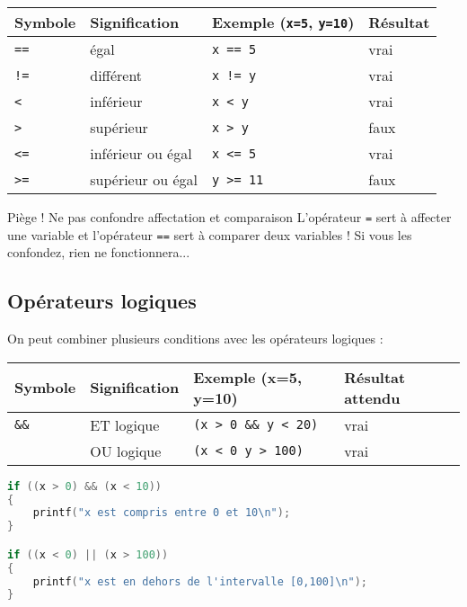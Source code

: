 \begin{center}
	\begin{tabular}{|l|l|l|l|}
		\hline
		Symbole     & Signification     & Exemple (\texttt{x=5}, \texttt{y=10}) & Résultat \\
		\hline
		\texttt{==} & égal              & \texttt{x == 5}                       & vrai     \\
		\texttt{!=} & différent         & \texttt{x != y}                       & vrai     \\
		\texttt{<}  & inférieur         & \texttt{x < y}                        & vrai     \\
		\texttt{>}  & supérieur         & \texttt{x > y}                        & faux     \\
		\texttt{<=} & inférieur ou égal & \texttt{x <= 5}                       & vrai     \\
		\texttt{>=} & supérieur ou égal & \texttt{y >= 11}                      & faux     \\
		\hline
	\end{tabular}
\end{center}
\begin{UPSTIwarning}{Piège ! Ne pas confondre affectation et comparaison}
	L'opérateur \texttt{=} sert à affecter une variable et l'opérateur \texttt{==} sert à comparer deux variables ! Si vous les confondez, rien ne fonctionnera...
\end{UPSTIwarning}

\subsection{Opérateurs logiques}

On peut combiner plusieurs conditions avec les opérateurs logiques :

\begin{center}
	\begin{tabular}{|l|l|l|l|}
		\hline
		Symbole                                         & Signification & Exemple (x=5, y=10)                                            & Résultat attendu \\
		\hline
		\texttt{\&\&}                                   & ET logique    & \texttt{(x > 0 \&\& y < 20)}                                   & vrai             \\
		\texttt{\textbar\textbar} & OU logique    & \texttt{(x < 0 \textbar\textbar y > 100)} & vrai             \\
		\hline
	\end{tabular}
\end{center}
\begin{lstlisting}[language=c]
if ((x > 0) && (x < 10))
{
    printf("x est compris entre 0 et 10\n");
}

if ((x < 0) || (x > 100))
{
    printf("x est en dehors de l'intervalle [0,100]\n");
}
\end{lstlisting}

